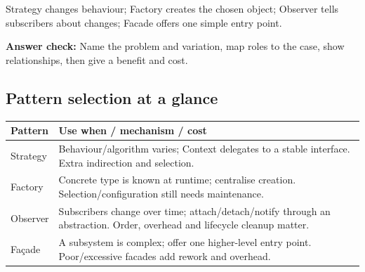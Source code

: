 
\begin{eli5box}Strategy changes behaviour; Factory creates the chosen object; Observer tells subscribers about changes; Facade offers one simple entry point.\end{eli5box}
\textbf{Answer check:} Name the problem and variation, map roles to the case, show relationships, then give a benefit and cost.
\subsection*{Pattern selection at a glance}


{\fontsize{9}{11}\selectfont
\begin{longtable}{L{.17\linewidth}L{.76\linewidth}}
\toprule{}\textbf{Pattern} & \textbf{Use when /\allowbreak{} mechanism /\allowbreak{} cost}\\\midrule\endhead
Strategy & Behaviour/\allowbreak{}algorithm varies; Context delegates to a stable interface. Extra indirection and selection.\\
Factory & Concrete type is known at runtime; centralise creation. Selection/\allowbreak{}configuration still needs maintenance.\\
Observer & Subscribers change over time; attach/\allowbreak{}detach/\allowbreak{}notify through an abstraction. Order, overhead and lifecycle cleanup matter.\\
Fa\c{c}ade & A subsystem is complex; offer one higher-level entry point. Poor/\allowbreak{}excessive facades add rework and overhead.\\\bottomrule
\end{longtable}}

